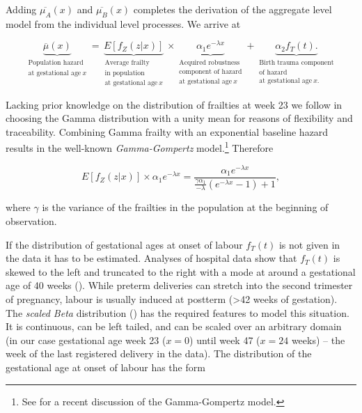 \documentclass[12pt, parskip=half]{scrartcl}
\begin{document}
Adding $\overline{\mu_A}(x)$ and $\overline{\mu_B}(x)$ completes the derivation of the aggregate level model from the individual level processes. We arrive at

\begin{equation}
  \underbrace{
    \overline{\mu}(x)
  }_{\substack{
    \text{Population hazard}\\ \text{at gestational age}~x
  }} =
  \underbrace{
    E[f_Z(z|x)]
  }_{\substack{
    \text{Average frailty}\\ \text{in population}\\ \text{at gestational age}~x
  }} \times
  \underbrace{
    \alpha_1 e^{-\lambda x}
  }_{\substack{
    \text{Acquired robustness}\\ \text{component of hazard}\\ \text{at gestational age}~x
  }} +
  \underbrace{
    \alpha_2 f_T(t).
  }_{\substack{
    \text{Birth trauma component}\\ \text{of hazard}\\ \text{at gestational age}~x.
  }}
  \label{eq:themodel}
\end{equation}

Lacking prior knowledge on the distribution of frailties at week 23 we follow \cite{Vaupel1979} in choosing the Gamma distribution with a unity mean for reasons of flexibility and traceability. Combining Gamma frailty with an exponential baseline hazard results in the well-known \emph{Gamma-Gompertz} model.\footnote{See \cite{Vaupel2014} for a recent discussion of the Gamma-Gompertz model.} Therefore

\begin{equation}
  E[f_Z(z|x)] \times \alpha_1 e^{-\lambda x} = \frac {\alpha_1 e^{-\lambda x}} {\frac{\gamma \alpha_1} {-\lambda} (e^{-\lambda x} - 1) + 1},
  \label{eq:gammagompertz}
\end{equation}

where $\gamma$ is the variance of the frailties in the population at the beginning of observation.

If the distribution of gestational ages at onset of labour $f_T(t)$ is not given in the data it has to be estimated. Analyses of hospital data show that $f_T(t)$ is skewed to the left and truncated to the right with a mode at around a gestational age of 40 weeks (\cite{Gardosi1997}). While preterm deliveries can stretch into the second trimester of pregnancy, labour is usually induced at postterm (>42 weeks of gestation). The \emph{scaled Beta} distribution (\cite{Johnson1995}) has the required features to model this situation. It is continuous, can be left tailed, and can be scaled over an arbitrary domain (in our case gestational age week 23 ($x = 0$) until week 47 ($x = 24$ weeks) -- the week of the last registered delivery in the data). The distribution of the gestational age at onset of labour has the form
\end{document}
